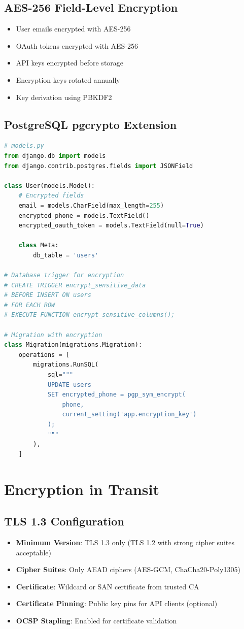 \documentclass{report}
\begin{document}
\subsection{AES-256 Field-Level Encryption}
\begin{itemize}
\item User emails encrypted with AES-256
\item OAuth tokens encrypted with AES-256
\item API keys encrypted before storage
\item Encryption keys rotated annually
\item Key derivation using PBKDF2
\end{itemize}

\subsection{PostgreSQL pgcrypto Extension}
\begin{lstlisting}[language=Python]
# models.py
from django.db import models
from django.contrib.postgres.fields import JSONField

class User(models.Model):
    # Encrypted fields
    email = models.CharField(max_length=255)
    encrypted_phone = models.TextField()
    encrypted_oauth_token = models.TextField(null=True)
    
    class Meta:
        db_table = 'users'

# Database trigger for encryption
# CREATE TRIGGER encrypt_sensitive_data
# BEFORE INSERT ON users
# FOR EACH ROW
# EXECUTE FUNCTION encrypt_sensitive_columns();

# Migration with encryption
class Migration(migrations.Migration):
    operations = [
        migrations.RunSQL(
            sql="""
            UPDATE users 
            SET encrypted_phone = pgp_sym_encrypt(
                phone, 
                current_setting('app.encryption_key')
            );
            """
        ),
    ]
\end{lstlisting}

\section{Encryption in Transit}

\subsection{TLS 1.3 Configuration}
\begin{itemize}
\item \textbf{Minimum Version}: TLS 1.3 only (TLS 1.2 with strong cipher suites acceptable)
\item \textbf{Cipher Suites}: Only AEAD ciphers (AES-GCM, ChaCha20-Poly1305)
\item \textbf{Certificate}: Wildcard or SAN certificate from trusted CA
\item \textbf{Certificate Pinning}: Public key pins for API clients (optional)
\item \textbf{OCSP Stapling}: Enabled for certificate validation
\end{itemize}
\end{document}
